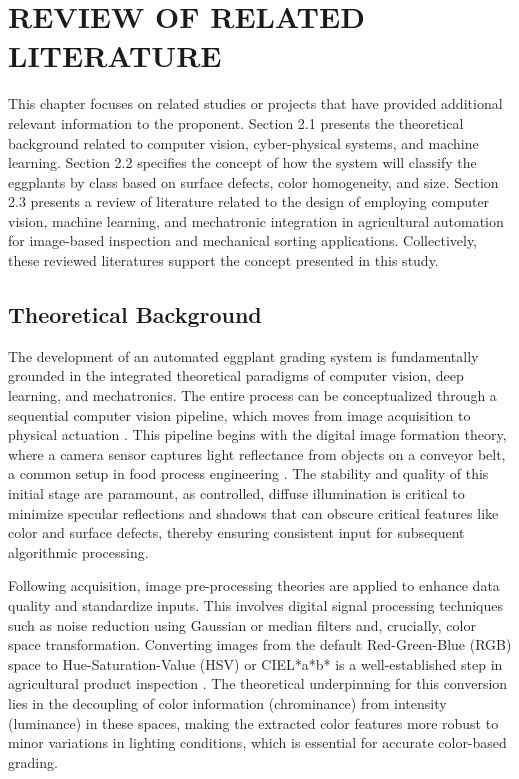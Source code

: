 \chapter{REVIEW OF RELATED LITERATURE}
{\baselineskip
 This chapter focuses on related studies or projects that have provided additional relevant information to the proponent. Section 2.1 presents the theoretical background related to computer vision, cyber-physical systems, and machine learning. Section 2.2 specifies the concept of how the system will classify the eggplants by class based on surface defects, color homogeneity, and size. Section 2.3 presents a review of literature related to the design of employing computer vision, machine learning, and mechatronic integration in agricultural automation for image-based inspection and mechanical sorting applications. Collectively, these reviewed literatures support the concept presented in this study. 


\section{Theoretical Background}
The development of an automated eggplant grading system is fundamentally grounded in the integrated theoretical paradigms of computer vision, deep learning, and mechatronics. The entire process can be conceptualized through a sequential computer vision pipeline, which moves from image acquisition to physical actuation \citep{szeliski2022computer}. This pipeline begins with the digital image formation theory, where a camera sensor captures light reflectance from objects on a conveyor belt, a common setup in food process engineering \citep{dougherty2020digital}. The stability and quality of this initial stage are paramount, as controlled, diffuse illumination is critical to minimize specular reflections and shadows that can obscure critical features like color and surface defects, thereby ensuring consistent input for subsequent algorithmic processing.

Following acquisition, image pre-processing theories are applied to enhance data quality and standardize inputs. This involves digital signal processing techniques such as noise reduction using Gaussian or median filters \citep{kumar2020comparative} and, crucially, color space transformation. Converting images from the default Red-Green-Blue (RGB) space to Hue-Saturation-Value (HSV) or CIEL*a*b* is a well-established step in agricultural product inspection \citep{khan2024intelligent}. The theoretical underpinning for this conversion lies in the decoupling of color information (chrominance) from intensity (luminance) in these spaces, making the extracted color features more robust to minor variations in lighting conditions, which is essential for accurate color-based grading.

}
